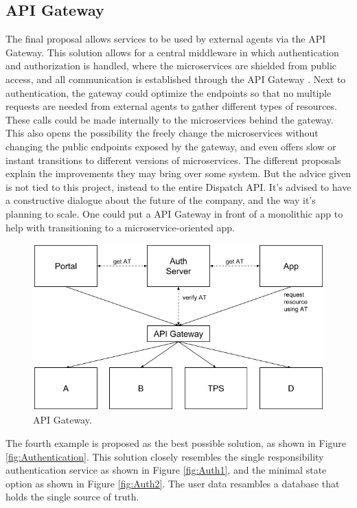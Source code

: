 \subsection{API Gateway}
The final proposal allows services to be used by external agents via the API Gateway. This solution allows for a central middleware in which authentication and authorization is handled, where the microservices are shielded from public access, and all communication is established through the API Gateway \cite{api-gateway}. Next to authentication, the gateway could optimize the endpoints so that no multiple requests are needed from external agents to gather different types of resources. These calls could be made internally to the microservices behind the gateway. This also opens the possibility the freely change the microservices without changing the public endpoints exposed by the gateway, and even offers slow or instant transitions to different versions of microservices. The different proposals explain the improvements they may bring over some system. But the advice given is not tied to this project, instead to the entire Dispatch API. It’s advised to have a constructive dialogue about the future of the company, and the way it’s planning to scale. One could put a API Gateway in front of a monolithic app to help with transitioning to a microservice-oriented app.

\begin{figure}[H]
	\centering
	\includegraphics[width=.7\textwidth]{Auth3}
	\caption[API Gateway]{API Gateway.}
	\label{fig:Auth3}
\end{figure}

The fourth example is proposed as the best possible solution, as shown in Figure \ref{fig:Authentication}. This solution closely resembles the single responsibility authentication service as shown in Figure \ref{fig:Auth1}, and the minimal state option as shown in Figure \ref{fig:Auth2}. The user data resambles a database that holds the single source of truth.

